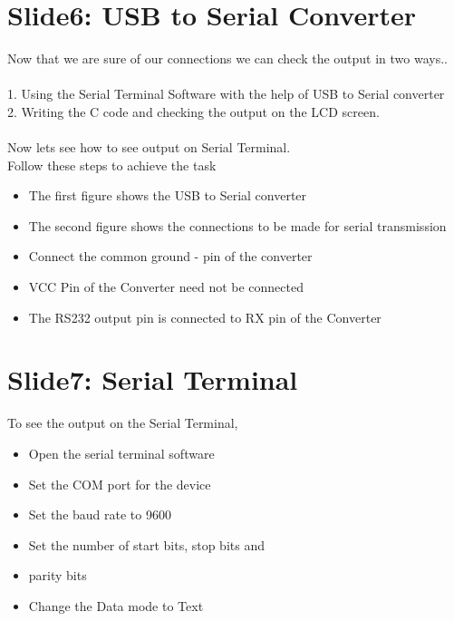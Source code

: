 \documentclass[a4paper,29.6pt]{article}
\begin{document}
\section{Slide6: USB to Serial Converter}
\begin{small}
Now that we are sure of our connections we can check the output in two ways..\\\\
1.	 Using the Serial Terminal Software with the help of USB to Serial converter\\
2.	Writing the C code and checking the output on the LCD screen.\\\\

Now lets see how to see output on Serial Terminal.\\ Follow these steps to achieve the task\\
\begin{itemize}
\item	The first figure shows the USB to Serial converter
\item	The second figure shows the connections to be made for serial transmission
\item	Connect the common ground - pin of the converter
\item	VCC Pin of the Converter need not be connected
\item	The RS232 output pin is connected to RX pin of the Converter
\end{itemize}

\end{small}

\section{Slide7: Serial Terminal}
\begin{small}
To see the output on the Serial Terminal,
\begin{itemize}
\item	Open the serial terminal software
\item	Set the COM port for the device
\item	Set the baud rate to 9600
\item	Set the number of start bits, stop bits and \item parity bits
\item	Change the Data mode to Text
\end{itemize}

\end{small}
\end{document}
